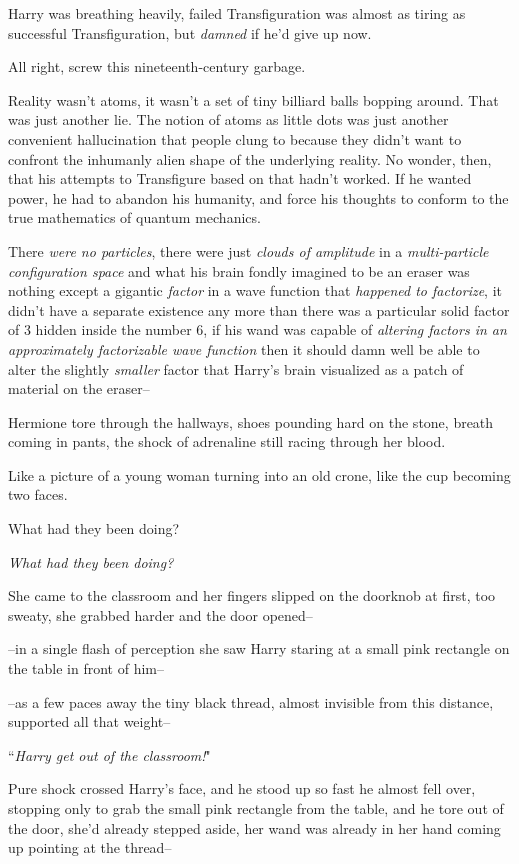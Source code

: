 Harry was breathing heavily, failed Transfiguration was almost as tiring as successful Transfiguration, but \emph{damned} if he'd give up now.

All right, screw this nineteenth-century garbage.

Reality wasn't atoms, it wasn't a set of tiny billiard balls bopping around. That was just another lie. The notion of atoms as little dots was just another convenient hallucination that people clung to because they didn't want to confront the inhumanly alien shape of the underlying reality. No wonder, then, that his attempts to Transfigure based on that hadn't worked. If he wanted power, he had to abandon his humanity, and force his thoughts to conform to the true mathematics of quantum mechanics.

There \emph{were no particles}, there were just \emph{clouds of amplitude} in a \emph{multi-particle configuration space} and what his brain fondly imagined to be an eraser was nothing except a gigantic \emph{factor} in a wave function that \emph{happened to factorize}, it didn't have a separate existence any more than there was a particular solid factor of 3 hidden inside the number 6, if his wand was capable of \emph{altering factors in an approximately factorizable wave function} then it should damn well be able to alter the slightly \emph{smaller} factor that Harry's brain visualized as a patch of material on the eraser\---

\later

Hermione tore through the hallways, shoes pounding hard on the stone, breath coming in pants, the shock of adrenaline still racing through her blood.

Like a picture of a young woman turning into an old crone, like the cup becoming two faces.

What had they been doing?

\emph{What had they been doing?}

She came to the classroom and her fingers slipped on the doorknob at first, too sweaty, she grabbed harder and the door opened\---

\---in a single flash of perception she saw Harry staring at a small pink rectangle on the table in front of him\---

\---as a few paces away the tiny black thread, almost invisible from this distance, supported all that weight\---

``\emph{Harry get out of the classroom!}"

Pure shock crossed Harry's face, and he stood up so fast he almost fell over, stopping only to grab the small pink rectangle from the table, and he tore out of the door, she'd already stepped aside, her wand was already in her hand coming up pointing at the thread\---

